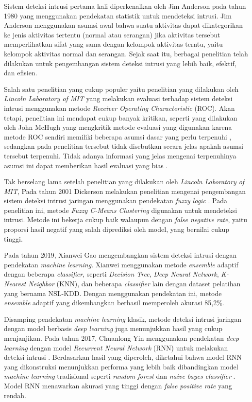 \documentclass[a4paper,12pt]{report}
\begin{document}
Sistem deteksi intrusi pertama kali diperkenalkan oleh Jim Anderson pada tahun 1980 \cite{andersonComputerSecurityThreat1980} yang menggunakan pendekatan statistik untuk mendeteksi intrusi. Jim Anderson menggunakan asumsi awal bahwa suatu aktivitas dapat dikategorikan ke jenis aktivitas tertentu (normal atau serangan) jika aktivitas tersebut memperlihatkan sifat yang sama dengan kelompok aktivitas terntu, yaitu kelompok aktivitas normal dan serangan. Sejak saat itu, berbagai penelitian telah dilakukan untuk pengembangan sistem deteksi intrusi yang lebih baik, efektif, dan efisien. 

Salah satu penelitian yang cukup populer yaitu penelitian yang dilakukan oleh \textit{Lincoln Laboratory of MIT} yang melakukan evaluasi terhadap sistem deteksi intrusi menggunakan metode \textit{Receiver Operating Characteristic} (ROC). Akan tetapi, penelitian ini mendapat cukup banyak kritikan, seperti yang dilakukan oleh John McHugh yang mengkritik metode evaluasi yang digunakan karena metode ROC sendiri memiliki beberapa asumsi dasar yang perlu terpenuhi \cite{mchugh1998LincolnLaboratory2000}, sedangkan pada penelitian tersebut tidak disebutkan secara jelas apakah asumsi tersebut terpenuhi. Tidak adanya informasi yang jelas mengenai terpenuhinya asumsi ini dapat memberikan hasil evaluasi yang bias \cite{mchugh1998LincolnLaboratory2000}. 

Tak berselang lama setelah penelitian yang dilakukan oleh \textit{Lincoln Laboratory of MIT}, Pada tahun 2001 Dickerson melakukan penelitian mengenai pengembangan sistem deteksi intrusi jaringan menggunakan pendekatan \textit{fuzzy logic} \cite{dickersonFuzzyIntrusionDetection2001}. Pada penelitian ini, metode \textit{Fuzzy C-Means Clustering} digunakan untuk mendeteksi intrusi. Metode ini bekerja cukup baik walaupun dengan \textit{false negative rate}, yaitu proporsi hasil negatif yang salah diprediksi oleh model, yang bernilai cukup tinggi.

Pada tahun 2019, Xianwei Gao mengembangkan sistem deteksi intrusi dengan pendekatan \textit{machine learning}. Xianwei menggunakan metode \textit{ensemble} adaptif dengan beberapa \textit{classifier}, seperti \textit{Decision Tree}, \textit{Deep Neural Network}, \textit{K-Nearest Neighbor} (KNN), dan beberapa \textit{classifier} lain \cite{gaoAdaptiveEnsembleMachine2019} dengan dataset pelatihan yang bernama NSL-KDD. Dengan menggunakan pendekatan ini, metode \textit{ensemble} adaptif yang dikembangkan berhasil memperoleh akurasi 85,2\%.

Disamping pendekatan \textit{machine learning} klasik, metode deteksi intrusi jaringan dengan model berbasis \textit{deep learning} juga menunjukkan hasil yang cukup menjanjikan. Pada tahun 2017, Chuanlong Yin menggunakan pendekatan \textit{deep learning} dengan model \textit{Recurrent Neural Network} (RNN) untuk melakukan deteksi intrusi \cite{yinDeepLearningApproach2017}. Berdasarkan hasil yang diperoleh, diketahui bahwa model RNN yang dikonstruksi menunjukkan performa yang lebih baik dibandingkan model \textit{machine learning} tradisional seperti \textit{random forest} dan \textit{naive bayes classifier} \cite{yinDeepLearningApproach2017}. Model RNN menawarkan akurasi yang tinggi dengan \textit{false positive rate} yang rendah. 
\end{document}

